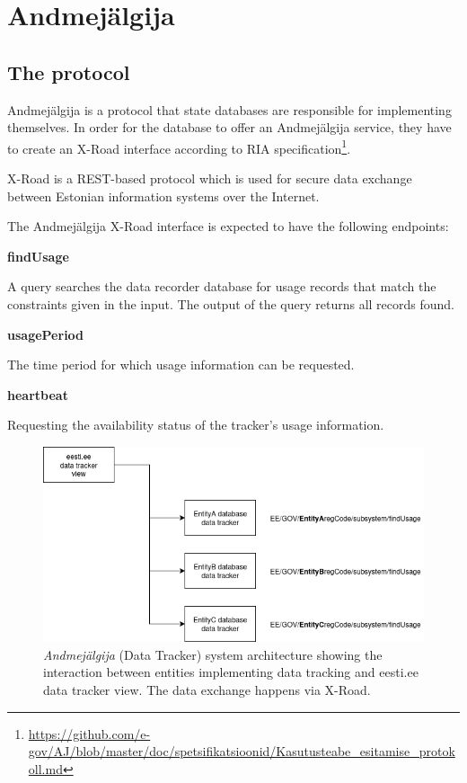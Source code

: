 \section{Andmejälgija} \label{Andmejälgija}

\subsection{The protocol} \label{protocol_desc}

Andmejälgija is a protocol that state databases are responsible for implementing themselves. In order for the database to offer an Andmejälgija service, they have to create an X-Road interface according to RIA specification\footnote{\url{https://github.com/e-gov/AJ/blob/master/doc/spetsifikatsioonid/Kasutusteabe_esitamise_protokoll.md}}. 

X-Road is a REST-based protocol which is used for secure data exchange between Estonian information systems over the Internet.

The Andmejälgija X-Road interface is expected to have the following endpoints:

\textbf{findUsage}

A query searches the data recorder database for usage records that match the constraints given in the input. The output of the query returns all records found.\cite{aj-github-spec}

\textbf{usagePeriod}

The time period for which usage information can be requested.\cite{aj-github-spec}

\textbf{heartbeat}

Requesting the availability status of the tracker's usage information.\cite{aj-github-spec}

\begin{figure}[H]
\centering
\includegraphics[width=450px]{english/figures/aj_model.PNG}
\caption{\textit{Andmejälgija} (Data Tracker) system architecture showing the interaction between entities implementing data tracking and eesti.ee data tracker view. The data exchange happens via X-Road.}
\label{fig:aj-model}
\end{figure}

